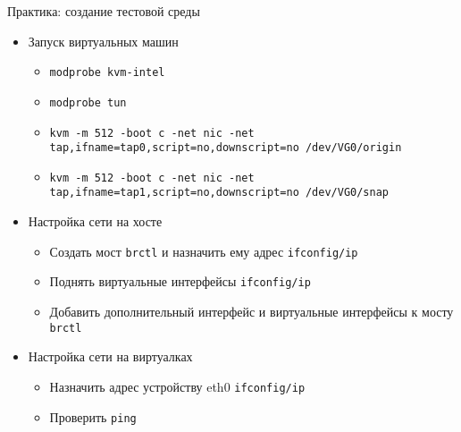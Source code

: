\documentclass[ignorenonframetext, professionalfonts, hyperref={pdftex, unicode}]{beamer}
\begin{document}
\begin{frame}{Практика: создание тестовой среды}
	\begin{itemize}
		\item Запуск виртуальных машин
			\begin{itemize}
				\item {\tt modprobe kvm-intel} 
				\item {\tt modprobe tun} 
				\item {\tt kvm -m 512 -boot c -net nic -net tap,ifname=tap0,script=no,downscript=no /dev/VG0/origin } 
				\item {\tt kvm -m 512 -boot c -net nic -net tap,ifname=tap1,script=no,downscript=no /dev/VG0/snap } 
			\end{itemize}
			\pause
		\item Настройка сети на хосте
			\begin{itemize}
				\item Создать мост {\tt brctl} и назначить ему адрес {\tt ifconfig/ip}
				\item Поднять виртуальные интерфейсы {\tt ifconfig/ip}
				\item Добавить дополнительный интерфейс и виртуальные интерфейсы к мосту {\tt brctl}
			\end{itemize}
			\pause
		\item Настройка сети на виртуалках
			\begin{itemize}
				\item Назначить адрес устройству eth0 {\tt ifconfig/ip}
				\item Проверить {\tt ping}
			\end{itemize}

	\end{itemize}
\end{frame}
\end{document}
